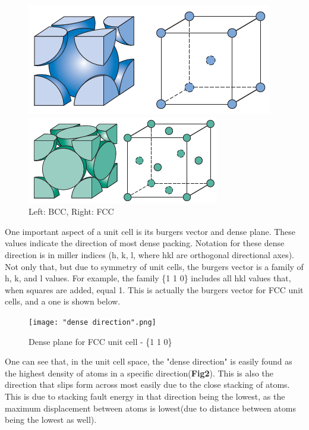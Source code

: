 \documentclass{article}
\begin{document}
\begin{figure}[h]
	\begin{minipage}{0.5\textwidth}
		\centering
		\includegraphics[scale=.7]{bcc.png}
	\end{minipage}
	\begin{minipage}{0.5\textwidth}
		\centering
		\includegraphics[scale=.85]{fcc.png}
	\end{minipage}
	\caption{Left: BCC, Right: FCC}
\end{figure}

One important aspect of a unit cell is its burgers vector and dense plane. These values indicate the direction of most dense packing. Notation for these dense direction is in miller indices (h, k, l, where hkl are orthogonal directional axes). Not only that, but due to symmetry of unit cells, the burgers vector is a family of h, k, and l values. For example, the family \{1 1 0\} includes all hkl values that, when squares are added, equal 1. This is actually the burgers vector for FCC unit cells, and a one is shown below.

\begin{figure}[h]
	\centering
	\texttt{[image: "dense direction".png]}
	\caption{Dense plane for FCC unit cell - \{1 1 0\}}
\end{figure}

One can see that, in the unit cell space, the "dense direction" is easily found as the highest density of atoms in a specific direction(\textbf{Fig2}). This is also the direction that slips form across most easily due to the close stacking of atoms. This is due to stacking fault energy in that direction being the lowest, as the maximum displacement between atoms is lowest(due to distance between atoms being the lowest as well).
\end{document}
